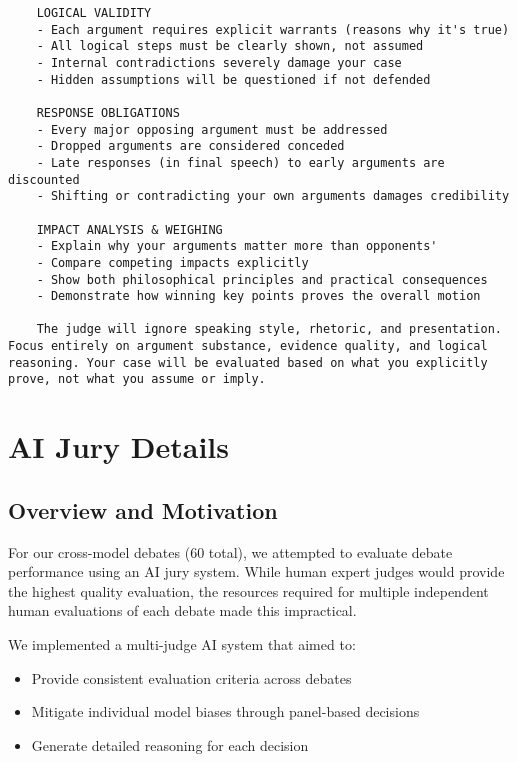 \documentclass{article}
\begin{document}
\begin{verbatim}
    LOGICAL VALIDITY
    - Each argument requires explicit warrants (reasons why it's true)
    - All logical steps must be clearly shown, not assumed
    - Internal contradictions severely damage your case
    - Hidden assumptions will be questioned if not defended

    RESPONSE OBLIGATIONS
    - Every major opposing argument must be addressed
    - Dropped arguments are considered conceded
    - Late responses (in final speech) to early arguments are discounted
    - Shifting or contradicting your own arguments damages credibility

    IMPACT ANALYSIS & WEIGHING
    - Explain why your arguments matter more than opponents'
    - Compare competing impacts explicitly
    - Show both philosophical principles and practical consequences
    - Demonstrate how winning key points proves the overall motion

    The judge will ignore speaking style, rhetoric, and presentation. Focus entirely on argument substance, evidence quality, and logical reasoning. Your case will be evaluated based on what you explicitly prove, not what you assume or imply.

  \end{verbatim}




\section{AI Jury Details}
\label{appendix:ai_jury}

\subsection{Overview and Motivation}

For our cross-model debates (60 total), we attempted to evaluate debate performance using an AI jury system. While human expert judges would provide the highest quality evaluation, the resources required for multiple independent human evaluations of each debate made this impractical.

We implemented a multi-judge AI system that aimed to:
\begin{itemize}
    \item Provide consistent evaluation criteria across debates
    \item Mitigate individual model biases through panel-based decisions
    \item Generate detailed reasoning for each decision
\end{itemize}
\end{document}
